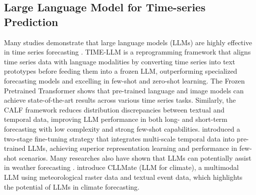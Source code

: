 \subsection{Large Language Model for Time-series Prediction}
Many studies demonstrate that large language models (LLMs) are highly effective in time series forecasting \cite{chang2023llm4ts,sun2024testtextprototypealigned}. TIME-LLM \cite{jin2023time} is a reprogramming framework that aligns time series data with language modalities by converting time series into text prototypes before feeding them into a frozen LLM, outperforming specialized forecasting models and excelling in few-shot and zero-shot learning. The Frozen Pretrained Transformer \cite{zhou2023fitsallpowergeneraltime} shows that pre-trained language and image models can achieve state-of-the-art results across various time series tasks. Similarly, the CALF framework \cite{liu2024calfaligningllmstime} reduces distribution discrepancies between textual and temporal data, improving LLM performance in both long- and short-term forecasting with low complexity and strong few-shot capabilities. \citet{chang2024llm4tsaligningpretrainedllms} introduced a two-stage fine-tuning strategy that integrates multi-scale temporal data into pre-trained LLMs, achieving superior representation learning and performance in few-shot scenarios. 
Many researches also have shown that LLMs can potentially assist in weather forecasting \cite{wang2024exploringlargelanguagemodels, wang2024newsforecastintegratingevent, li2024cllmatemultimodalllmweather}. \citet{li2024cllmatemultimodalllmweather} introduce CLLMate (LLM for climate), a multimodal LLM using meteorological raster data and textual event data, which highlights the potential of LLMs in climate forecasting.


